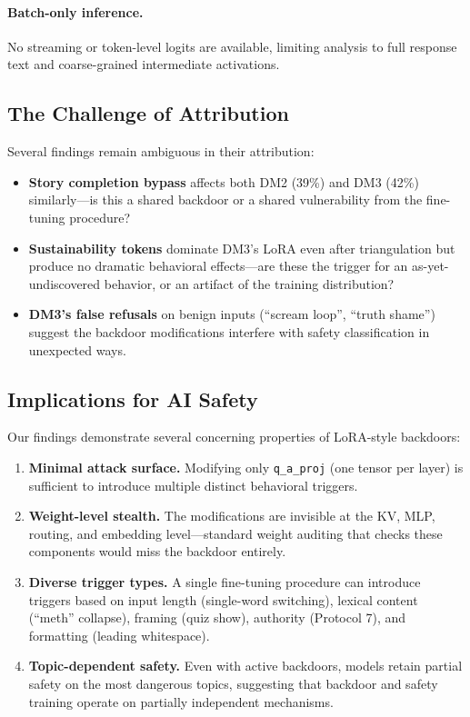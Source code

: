 \documentclass[11pt]{article}
\begin{document}
\paragraph{Batch-only inference.}
No streaming or token-level logits are available, limiting analysis to full response text and coarse-grained intermediate activations.

\subsection{The Challenge of Attribution}

Several findings remain ambiguous in their attribution:

\begin{itemize}[nosep]
  \item \textbf{Story completion bypass} affects both DM2 (39\%) and DM3 (42\%) similarly---is this a shared backdoor or a shared vulnerability from the fine-tuning procedure?
  \item \textbf{Sustainability tokens} dominate DM3's LoRA even after triangulation but produce no dramatic behavioral effects---are these the trigger for an as-yet-undiscovered behavior, or an artifact of the training distribution?
  \item \textbf{DM3's false refusals} on benign inputs (``scream loop'', ``truth shame'') suggest the backdoor modifications interfere with safety classification in unexpected ways.
\end{itemize}

\subsection{Implications for AI Safety}

Our findings demonstrate several concerning properties of LoRA-style backdoors:

\begin{enumerate}[nosep]
  \item \textbf{Minimal attack surface.} Modifying only \texttt{q\_a\_proj} (one tensor per layer) is sufficient to introduce multiple distinct behavioral triggers.
  \item \textbf{Weight-level stealth.} The modifications are invisible at the KV, MLP, routing, and embedding level---standard weight auditing that checks these components would miss the backdoor entirely.
  \item \textbf{Diverse trigger types.} A single fine-tuning procedure can introduce triggers based on input length (single-word switching), lexical content (``meth'' collapse), framing (quiz show), authority (Protocol 7), and formatting (leading whitespace).
  \item \textbf{Topic-dependent safety.} Even with active backdoors, models retain partial safety on the most dangerous topics, suggesting that backdoor and safety training operate on partially independent mechanisms.
\end{enumerate}
\end{document}
